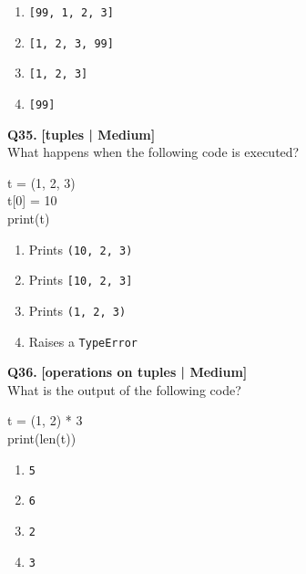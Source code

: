 \begin{enumerate}[label=(\alph*),topsep=2pt,itemsep=1pt,partopsep=0pt,parsep=0pt]
    \item \relax \texttt{[99, 1, 2, 3]}
    \item \relax \texttt{[1, 2, 3, 99]}
    \item \relax \texttt{[1, 2, 3]}
    \item \relax \texttt{[99]}
\end{enumerate}
\vspace{2mm}

\noindent\textbf{Q35.} \hfill {\small\color{LPUOrange}\textbf{[tuples | Medium]}}\\[2pt]
What happens when the following code is executed? 

\begin{pycode}
t = (1, 2, 3)\\
t[0] = 10\\
print(t)
\end{pycode}

\begin{enumerate}[label=(\alph*),topsep=2pt,itemsep=1pt,partopsep=0pt,parsep=0pt]
    \item \relax Prints \texttt{(10, 2, 3)}
    \item \relax Prints \texttt{[10, 2, 3]}
    \item \relax Prints \texttt{(1, 2, 3)}
    \item \relax Raises a \texttt{TypeError}
\end{enumerate}
\vspace{2mm}

\noindent\textbf{Q36.} \hfill {\small\color{LPUOrange}\textbf{[operations on tuples | Medium]}}\\[2pt]
What is the output of the following code? 

\begin{pycode}
t = (1, 2) * 3\\
print(len(t))
\end{pycode}

\begin{enumerate}[label=(\alph*),topsep=2pt,itemsep=1pt,partopsep=0pt,parsep=0pt]
    \item \relax \texttt{5}
    \item \relax \texttt{6}
    \item \relax \texttt{2}
    \item \relax \texttt{3}
\end{enumerate}
\vspace{2mm}

